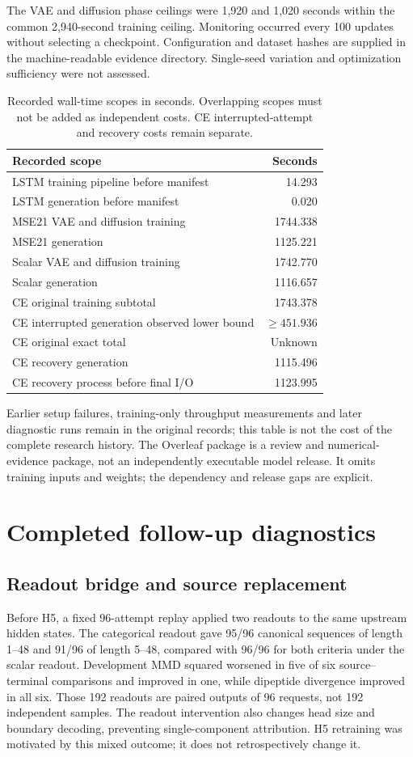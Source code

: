\documentclass[12pt,a4paper]{article}
\begin{document}
The VAE and diffusion phase ceilings were 1,920 and 1,020 seconds within the common 2,940-second training ceiling. Monitoring occurred every 100 updates without selecting a checkpoint. Configuration and dataset hashes are supplied in the machine-readable evidence directory. Single-seed variation and optimization sufficiency were not assessed.

\begin{table}[htbp]\centering\singlespacing\small
\caption{Recorded wall-time scopes in seconds. Overlapping scopes must not be added as independent costs. CE interrupted-attempt and recovery costs remain separate.}
\begin{tabular}{p{.60\linewidth}r}\toprule
Recorded scope & Seconds\\\midrule
LSTM training pipeline before manifest & 14.293\\
LSTM generation before manifest & 0.020\\
MSE21 VAE and diffusion training & 1744.338\\
MSE21 generation & 1125.221\\
Scalar VAE and diffusion training & 1742.770\\
Scalar generation & 1116.657\\
CE original training subtotal & 1743.378\\
CE interrupted generation observed lower bound & $\geq451.936$\\
CE original exact total & Unknown\\
CE recovery generation & 1115.496\\
CE recovery process before final I/O & 1123.995\\\bottomrule
\end{tabular}\end{table}
Earlier setup failures, training-only throughput measurements and later diagnostic runs remain in the original records; this table is not the cost of the complete research history. The Overleaf package is a review and numerical-evidence package, not an independently executable model release. It omits training inputs and weights; the dependency and release gaps are explicit.

\section{Completed follow-up diagnostics}
\subsection{Readout bridge and source replacement}
Before H5, a fixed 96-attempt replay applied two readouts to the same upstream hidden states. The categorical readout gave 95/96 canonical sequences of length 1--48 and 91/96 of length 5--48, compared with 96/96 for both criteria under the scalar readout. Development MMD squared worsened in five of six source--terminal comparisons and improved in one, while dipeptide divergence improved in all six. Those 192 readouts are paired outputs of 96 requests, not 192 independent samples. The readout intervention also changes head size and boundary decoding, preventing single-component attribution. H5 retraining was motivated by this mixed outcome; it does not retrospectively change it.
\end{document}

